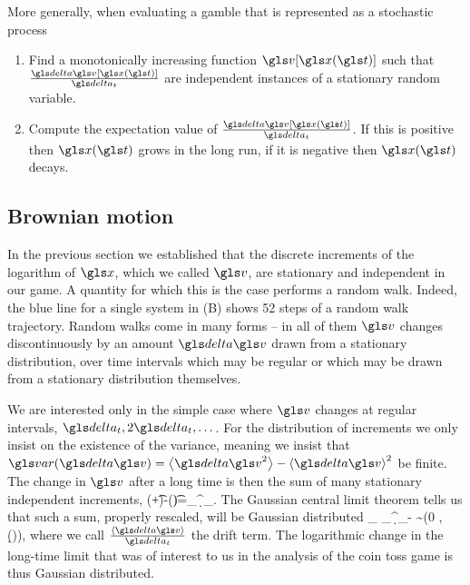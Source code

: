 More generally, when evaluating a gamble that is represented as a stochastic process 
\begin{enumerate}
\item
Find a monotonically increasing function $\gv[\x(\t)]$ such that $\frac{\d \gv[\x(\t)]}{\dt}$ 
are independent instances of a stationary random variable.
\item
Compute the expectation value of $\frac{\d \gv[\x(\t)]}{\dt}$. If this is positive then $\x(\t)$
grows in the long run, if it is negative then $\x(\t)$ decays.
\end{enumerate}


\subsection{Brownian motion}
In the previous section we established that the discrete increments of the logarithm of 
$\x$, which we called $\gv$, are stationary and independent in our game. A quantity 
for which this is the case performs a random walk.
Indeed, the blue line for a single system in  (B) shows 52 steps of a random walk trajectory.
Random walks come in many forms -- in all of them $\gv$ changes discontinuously by an amount 
$\d \gv$ drawn from a stationary distribution, over time intervals which may be regular or which may be drawn from a stationary distribution themselves.

We are interested only in the simple case where $\gv$ changes at regular intervals, $\dt, 2\dt, \dots$. For 
the distribution of increments we only insist on the existence of the variance, meaning we insist that 
$\var(\d \gv)=\ave{\d \gv^2}-\ave{\d \gv}^2$ be finite. The change in $\gv$ after a long time is then the sum 
of many stationary independent increments, 
\be
\gv(\t+\T\dt)-\gv(\t)=\sum_\gi^\T \d \gv_\gi.
\ee
The Gaussian central limit theorem tells us that such a sum, properly rescaled, will be 
Gaussian distributed
\be
\lim_{\T\to\infty} \sum_\gi^\T \d \gv_\gi -\T\ave{\d \gv} \sim \mathcal{\N}(0 , \var(\d \gv)),
\ee
where we call $\frac{\ave{\d \gv}}{\dt}$ the drift term. The logarithmic change in the 
long-time limit that was of interest to us in the analysis of the coin toss game is thus 
Gaussian distributed. 

